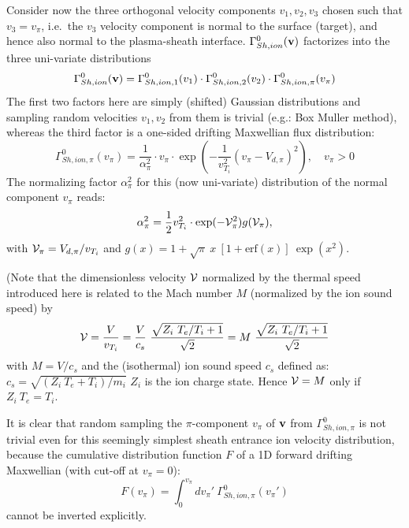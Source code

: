 Consider now the three orthogonal velocity components $v_1,v_2,v_3$ chosen such
that $v_3 = v_\pi$, i.e.\ the $v_3$ velocity component is normal to the surface
(target), and hence also normal to the plasma-sheath interface.
$\Gamma^0_{Sh,ion}(\mathbf{v})$ factorizes into the three uni-variate distributions
\begin{equation}
  \Gamma^0_{Sh,ion}(\mathbf{v})=\Gamma^0_{Sh,ion,1}(v_1)\cdot
  \Gamma^0_{Sh,ion,2}(v_2) \cdot \Gamma^0_{Sh,ion,\pi}(v_\pi)
\end{equation}
The
first two factors here are simply (shifted) Gaussian distributions and sampling
random velocities $v_1, v_2$ from them is trivial (e.g.: Box Muller method),
whereas the third factor is a one-sided drifting Maxwellian flux distribution:
\begin{equation}
  \Gamma^0_{Sh,ion,\pi}
  (v_\pi) = \frac{1}{\alpha^2_\pi}   \cdot   v_{\pi}   \cdot \exp \left ( -
  \frac{1}{v_{T_i}^2} (v_\pi - V_{d,\pi} )^2  \right ), \quad v_{\pi} > 0
\end{equation}
The normalizing factor $\alpha_{\pi}^2$ for this (now
uni-variate) distribution of the normal component  $v_\pi$ reads:
\begin{equation}
  \alpha_{\pi}^2 = \frac12 v_{T_i}^2  \cdot  \exp(-{\cal V}^2_{\pi} )
  g({\cal V}_{\pi} ),
  \label{eq1.27}
\end{equation}
with ${\cal V}_{\pi} = V_{d,\pi}/   v_{T_i}
$ and $ g(x) = 1   +   \sqrt{\pi} ~  x ~  [1 + \mathrm{erf}(x)] ~  \exp(x^2 )$.

(Note that the dimensionless velocity $\cal V$ normalized by the thermal speed
introduced here is related to the Mach number $M$ (normalized by the ion sound
speed) by
\begin{equation}
  \label{normfac} {\cal V} = \frac{V}{v_{T_i}} =
  \frac{V}{c_s}~ \frac{\sqrt{Z_i~T_e/T_i+1}}{\sqrt{2}} = M
  ~\frac{\sqrt{Z_i~T_e/T_i+1}}{\sqrt{2}}
\end{equation}
with $M = V/c_s$ and the
(isothermal) ion sound speed $c_s$ defined as:
$c_s=\sqrt{(Z_i~T_e+T_i)/m_i}$ $Z_i$ is the ion charge state.
Hence ${\cal V} = M$ only if $Z_i~T_e=T_i$.

It is clear that random sampling the $\pi$-component $v_{\pi}$ of $\mathbf{v} $ from
$\Gamma^0_{Sh,ion,\pi}$ is not trivial even for this seemingly simplest sheath
entrance ion velocity distribution,  because the cumulative distribution
function $F$ of a 1D forward drifting Maxwellian (with cut-off at $v_{\pi}=0$):
\begin{equation}
  F ( v_{\pi} ) = \int_{0}^{v_{\pi}} dv_{\pi} ' \ \Gamma^{0}_{Sh,ion,\pi} (
  v_{\pi} ' ) \label{eq1.25}
\end{equation}
cannot be inverted explicitly.

